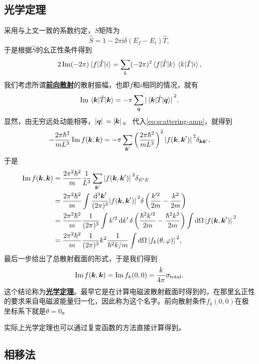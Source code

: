 \documentclass[UTF8, a4paper]{ctexart}
\newcommand*{\ii}{\mathrm{i}}
\newcommand{\concept}[1]{\underline{\textbf{#1}}}
\begin{document}
\subsection{光学定理}

采用与上文一致的系数约定，$S$矩阵为
\[
    \hat{S} = 1 - 2 \pi \ii \delta(E_f - E_i) \hat{T},
\]
于是根据$\hat{S}$的幺正性条件得到
\[
    2 \Im (- 2 \pi) \mel*{f}{\hat{T}}{i} = \sum_k (- 2 \pi)^2 \mel*{f}{\hat{T}}{k} \mel*{k}{\hat{T}}{i},
\]
我们考虑所谓\concept{前向散射}的散射振幅，也即$f$和$i$相同的情况，就有
\[
    \Im \mel*{\vb*{k}}{\hat{T}}{\vb*{k}} = - \pi \sum_{\vb*{q}} \abs*{\mel*{\vb*{k}}{\hat{T}}{\vb*{q}}}^2.
\]
显然，由无穷远处动能相等，$\abs*{\vb*{q}} = \abs*{\vb*{k}}$。
代入\eqref{eq:scattering-amp}，就得到
\[
    - \frac{2 \pi \hbar^2}{m L^3} \Im f(\vb*{k}, \vb*{k}) = - \pi \sum_{\vb*{k}'} \left( \frac{2 \pi \hbar^2}{m L^3} \right)^2 \abs*{f(\vb*{k}, \vb*{k}')}^2 \delta_{\vb*{k} \vb*{k}'},
\]
于是
\[
    \begin{aligned}
        \Im f(\vb*{k}, \vb*{k}) &= \frac{2\pi^2 \hbar^2}{m} \frac{1}{L^3} \sum_{\vb*{k}'} \abs*{f(\vb*{k}, \vb*{k}')}^2 \delta_{E' E} \\
        &= \frac{2\pi^2 \hbar^2}{m} \int \frac{\dd[3]{\vb*{k}'}}{(2\pi)^3} \abs*{f(\vb*{k}, \vb*{k}')}^2 \delta\left(\frac{k'^2}{2m} - \frac{k^2}{2m}\right) \\
        &= \frac{2\pi^2 \hbar^2}{m} \frac{1}{(2\pi)^3} \int k'^2 \dd{k'} \delta\left(\frac{\hbar^2 k'^2}{2m} - \frac{\hbar^2 k^2}{2m}\right) \int \dd{\Omega} \abs*{f(\vb*{k}, \vb*{k}')}^2 \\
        &= \frac{2\pi^2 \hbar^2}{m} \frac{1}{(2\pi)^3} k^2 \frac{1}{\hbar^2 k / m} \int \dd{\Omega} \abs*{f_k(\theta, \varphi)}^2 ,
    \end{aligned}
\]
最后一步给出了总散射截面的形式，于是我们得到
\begin{equation}
    \Im f(\vb*{k}, \vb*{k}) = \Im f_k(0, 0) = \frac{k}{4\pi} \sigma_\text{total}.
\end{equation}
这个结论称为\concept{光学定理}。最早它是在计算电磁波散射截面时得到的，在那里幺正性的要求来自电磁波能量归一化，因此称为这个名字。前向散射条件$f_k(0, 0)$在极坐标系下就是$\theta=0$。

实际上光学定理也可以通过复变函数的方法直接计算得到。

\subsection{相移法}
\end{document}
